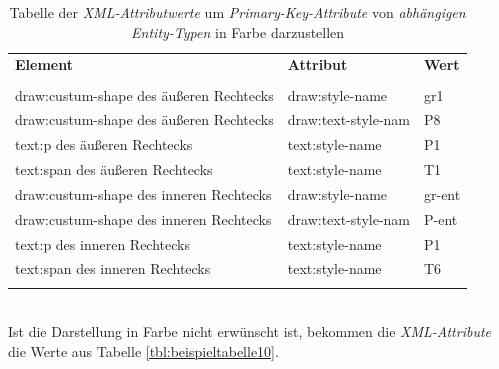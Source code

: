 \begin{table}[H]
	\centering
	\begin{tabular}{lll}
		\textbf{Element} & \textbf{Attribut}  & \textbf{Wert} \\
		\\
		draw:custum-shape des äußeren Rechtecks & draw:style-name           & gr1             \\
		draw:custum-shape des äußeren Rechtecks & draw:text-style-nam      & P8            \\
		text:p des äußeren Rechtecks & text:style-name       & P1             \\
		text:span des äußeren Rechtecks & text:style-name       & T1             \\
		draw:custum-shape des inneren Rechtecks & draw:style-name           & gr-ent             \\
		draw:custum-shape des inneren Rechtecks & draw:text-style-nam      & P-ent            \\
		text:p des inneren Rechtecks & text:style-name       & P1             \\
		text:span des inneren Rechtecks & text:style-name       & T6             \\
		\\
	\end{tabular}
	
	\caption{Tabelle der \textit{XML-Attributwerte} um \textit{Primary-Key-Attribute} von \textit{abhängigen Entity-Typen} in Farbe darzustellen}
	\label{tbl:beispieltabelle9}
	
\end{table}
\noindent
\hon{}
\\
\noindent
Ist die Darstellung in Farbe nicht erwünscht ist, bekommen die \textit{XML-Attribute} die Werte aus Tabelle \ref{tbl:beispieltabelle10}. 

